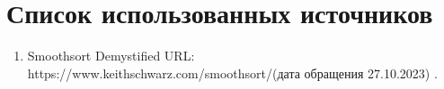 \chapter*{Список использованных источников}

\begin{enumerate}
	 Кормен Т. Алгоритмы: построение и анализ [Текст] / Кормен Т. - Вильямс, 2014. - 198 с. - 219 с.
	 Основные виды сортировок и примеры их реализации // Академия Яндекса URL: \newline https://academy.yandex.ru/journal/osnovnye-vidy-sortirovok-i-primery-ikh-realizatsii (дата обращения: 16.10.2023).
	\item  Smoothsort Demystified URL: \newline https://www.keithschwarz.com/smoothsort/(дата обращения 27.10.2023) \label{lib:smooth}.
	
\end{enumerate}
